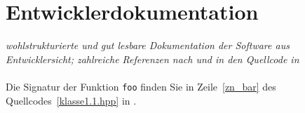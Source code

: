 \chapter{Entwicklerdokumentation}
\label{ch:5}

{\em wohlstrukturierte und gut lesbare Dokumentation der Software aus 
Entwicklersicht; zahlreiche Referenzen nach  und in den
Quellcode in } \\
\\
Die Signatur der Funktion {\tt foo} finden Sie in Zeile~\ref{zn_bar} des Quellcodes~\ref{klasse1.1.hpp} in .

